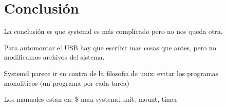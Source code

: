 \documentclass[10pt,a4paper]{article}
\begin{document}
\section{Conclusi\'on}

La conclusi\'on es que systemd es m\'as complicado pero no nos queda otra.

Para automontar el USB hay que escribir mas cosas que antes, pero no modificamos archivos del sistema.

Systemd parece ir en contra de la filosofia de unix: evitar los programas monoliticos (un programa por cada tarea)

Los manuales estan en: \$ man systemd.{unit, mount, timer}
\end{document}
